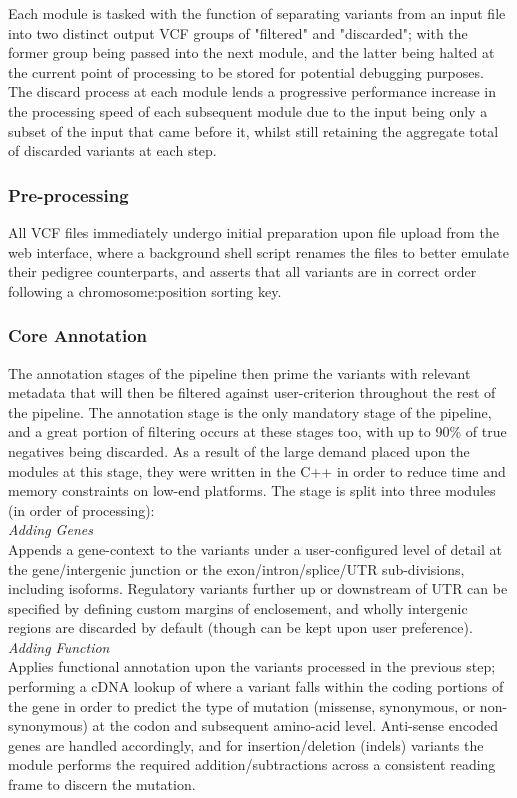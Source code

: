 \documentclass[twocolumn]{bmcart}%
\newcommand{\triplesub}[2]{\noindent\textsl{#1}\\#2\\}  %
\begin{document}
Each module is tasked with the function of separating variants from an input file into two distinct output VCF groups of "filtered" and "discarded"; with the former group being passed into the next module, and the latter being halted at the current point of processing to be stored for potential debugging purposes. The discard process at each module lends a progressive performance increase in the processing speed of each subsequent module due to the input being only a subset of the input that came before it, whilst still retaining the aggregate total of discarded variants at each step.

\subsubsection{Pre-processing}

All VCF files immediately undergo initial preparation upon file upload from the web interface, where a background shell script renames the files to better emulate their pedigree counterparts, and asserts that all variants are in correct order following a chromosome:position sorting key.


\subsubsection{Core Annotation}

The annotation stages of the pipeline then prime the variants with relevant metadata that will then be filtered against user-criterion throughout the rest of the pipeline. The annotation stage is the only mandatory stage of the pipeline, and a great portion of filtering occurs at these stages too, with up to 90\% of true negatives being discarded. As a result of the large demand placed upon the modules at this stage, they were written in the C++ in order to reduce time and memory constraints on low-end platforms. The stage is split into three modules (in order of processing):\\

\triplesub{Adding Genes}{
Appends a gene-context to the variants under a user-configured level of detail at the gene/intergenic junction or the exon/intron/splice/UTR sub-divisions, including isoforms. Regulatory variants further up or downstream of UTR can be specified by defining custom margins of enclosement, and wholly intergenic regions are discarded by default (though can be kept upon user preference).}

\triplesub{Adding Function}{
Applies functional annotation upon the variants processed in the previous step; performing a cDNA lookup of where a variant falls within the coding portions of the gene in order to predict the type of mutation (missense, synonymous, or non-synonymous) at the codon and subsequent amino-acid level. Anti-sense encoded genes are handled accordingly, and for insertion/deletion (indels) variants the module performs the required addition/subtractions across a consistent reading frame to discern the mutation.}
\end{document}
